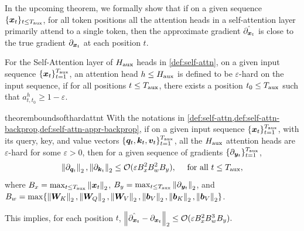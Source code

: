 In the upcoming theorem, we formally show that if on a given sequence $\{{\bm{x}}_t\}_{t \le T_{\text{aux}}}$, for all token positions all the attention heads in a self-attention layer primarily attend to a single token, then the approximate gradient $\Hat{\partial_{{\bm{x}}_t}}$ is  close to the true gradient $\partial_{{\bm{x}}_t}$ at each position $t$. 

\begin{definition}\label{def:hard_attn}
For the Self-Attention layer of $H_{\text{aux}}$ heads in \cref{def:self-attn}, on a given input sequence $\{{\bm{x}}_t\}_{t=1}^{T_{\text{aux}}}$, an attention head $h \le H_{\text{aux}}$ is defined to be $\varepsilon$-hard on the input sequence, if for all positions $t \le T_{\text{aux}}$, there exists a position $t_0 \le T_{\text{aux}}$ such that $a_{t, t_0}^h \ge 1 - \varepsilon$.
\end{definition}




\begin{restatable}{theorem}{boundsofthardattnt}\label{thm:attn_backprop}
With the notations in \cref{def:self-attn,def:self-attn-backprop,def:self-attn-appr-backprop}, if on a given input sequence $\{{\bm{x}}_t\}_{t=1}^{T_{\text{aux}}}$, with its query, key, and value vectors $\{{\bm{q}}_t, {\bm{k}}_t, {\bm{v}}_t\}_{t=1}^{T_{\text{aux}}}$, all the $H_{\text{aux}}$ attention heads are $\varepsilon$-hard for some $\varepsilon > 0$, then for a given sequence of gradients $\{\partial_{{\bm{y}}_t}\}_{t=1}^{T_{\text{aux}}}$, 
\begin{align*}
    \left\|\partial_{{\bm{q}}_t}\right\|_2, \left\|\partial_{{\bm{k}}_t}\right\|_2 \le \mathcal{O}( \varepsilon B_x^2 B^2_w B_y ), \quad \text{ for all } t \le T_{\text{aux}},
\end{align*}
where $B_x = \max_{t \le T_{\text{aux}}} \left\|{\bm{x}}_t\right\|_2$, $B_y = \max_{t \le T_{\text{aux}}} \left\| \partial_{{\bm{y}}_t} \right\|_2$, and $B_w = \max\{ \left\|{\bm{W}}_K\right\|_2, \left\|{\bm{W}}_Q\right\|_2, \left\|{\bm{W}}_V\right\|_2, \left\|{\bm{b}}_V\right\|_2, \left\|{\bm{b}}_K\right\|_2, \left\|{\bm{b}}_V\right\|_2 \} $.

This implies, for each position $t$, $\left\| \Hat{\partial_{{\bm{x}}_t}} - \partial_{{\bm{x}}_t} \right\|_2 \le \mathcal{O}(\varepsilon B_x^2 B_w^3 B_y).$
\end{restatable}
